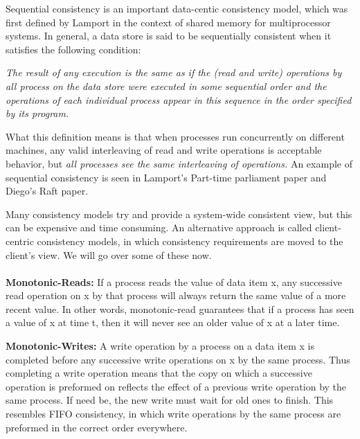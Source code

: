 \documentclass[9pt]{extarticle} %
\begin{document}
%
%
\begin{minipage}[t]{.64\linewidth} %
\vspace{-0.4cm}
\hypertarget{firstnews}{}
Sequential consistency is an important data-centic consistency model, which was first defined by Lamport in the context of shared memory for multiprocessor systems. In general, a data store is said to be sequentially consistent when it satisfies the following condition:
\begin{changemargin}{0.6cm}{0.6cm} 
\textit{The result of any execution is the same as if the (read and write) operations by all process on the data store were executed in some sequential order and the operations of each individual process appear in this sequence in the order specified by its program.}
\end{changemargin}
What this definition means is that when processes run concurrently on different machines, any valid interleaving of read and write operations is acceptable behavior, but \textit{all processes see the same interleaving of operations.} An example of sequential consistency is seen in Lamport's Part-time parliament paper and Diego's Raft paper.


\hypertarget{secondnews}{}

Many consistency models try and provide a system-wide consistent view, but this can be expensive and time consuming. An alternative approach is called client-centric consistency models, in which consistency requirements are moved to the client's view. We will go over some of these now. \\
\\
\textbf{Monotonic-Reads:} If a process reads the value of data item x, any successive read operation on x by that process will always return the same value of a more recent value. In other words, monotonic-read guarantees that if a process has seen a value of x at time t, then it will never see an older value of x at a later time.

\textbf{Monotonic-Writes:} A write operation by a process on a data item x is completed before any successive write operations on x by the same process. Thus completing a write operation means that the copy on which a successive operation is preformed on reflects the effect of a previous write operation by the same process. If need be, the new write must wait for old ones to finish. This resembles FIFO consistency, in which write operations by the same process are preformed in the correct order everywhere. 


\end{minipage}
\end{document}
